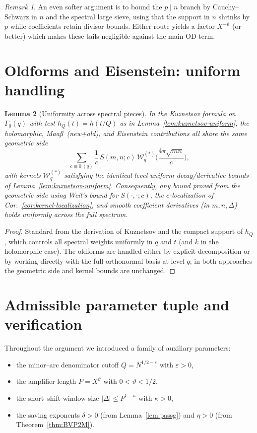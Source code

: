 \documentclass[11pt]{article}
\newtheorem{lemma}{Lemma}[part]
\theoremstyle{definition}
\theoremstyle{remark}
\newtheorem{remark}[lemma]{Remark}
\numberwithin{equation}{part}
\begin{document}
\begin{remark}
	An even softer argument is to bound the $p\mid n$ branch by Cauchy--Schwarz in $n$ and the spectral large sieve, using that the support in $n$ shrinks by $p$ while coefficients retain divisor bounds. Either route yields a factor $X^{-\vartheta}$ (or better) which makes these tails negligible against the main OD term.
\end{remark}

\section{Oldforms and Eisenstein: uniform handling}\label{sec:old-eis}

\begin{lemma}[Uniformity across spectral pieces]\label{lem:oldforms-eis-uniform}
	In the Kuznetsov formula on $\Gamma_0(q)$ with test $h_Q(t)=h(t/Q)$ as in Lemma~\ref{lem:kuznetsov-uniform},
	the holomorphic, Maa\ss\ (new+old), and Eisenstein contributions all share the same geometric side
	\[
		\sum_{c\equiv 0\ (q)} \frac{1}{c}\,S(m,n;c)\,\mathcal W_q^{(*)}\!\Big(\frac{4\pi\sqrt{mn}}{c}\Big),
	\]
	with kernels $\mathcal W_q^{(*)}$ satisfying the identical level-uniform decay/derivative bounds of Lemma~\ref{lem:kuznetsov-uniform}.
	Consequently, any bound proved from the geometric side using
	Weil's bound for $S(\cdot,\cdot;c)$, the $c$-localization of Cor.~\ref{cor:kernel-localization},
	and smooth coefficient derivatives (in $m,n,\Delta$) holds \emph{uniformly} across the full spectrum.
\end{lemma}

\begin{proof}
	Standard from the derivation of Kuznetsov and the compact support of $h_Q$, which controls all spectral weights uniformly in $q$ and $t$ (and $k$ in the holomorphic case). The oldforms are handled either by explicit decomposition or by working directly with the full orthonormal basis at level $q$; in both approaches the geometric side and kernel bounds are unchanged.
\end{proof}

\section{Admissible parameter tuple and verification}
\label{app:parameters}

Throughout the argument we introduced a family of auxiliary parameters:
\begin{itemize}
	\item the minor--arc denominator cutoff $Q = N^{1/2-\varepsilon}$ with $\varepsilon>0$,
	\item the amplifier length $P = X^{\vartheta}$ with $0<\vartheta<1/2$,
	\item the short--shift window size $|\Delta|\le P^{1-\kappa}$ with $\kappa>0$,
	\item the saving exponents $\delta>0$ (from Lemma~\ref{lem:passg}) and $\eta>0$ (from Theorem~\ref{thm:BVP2M}).
\end{itemize}
\end{document}
